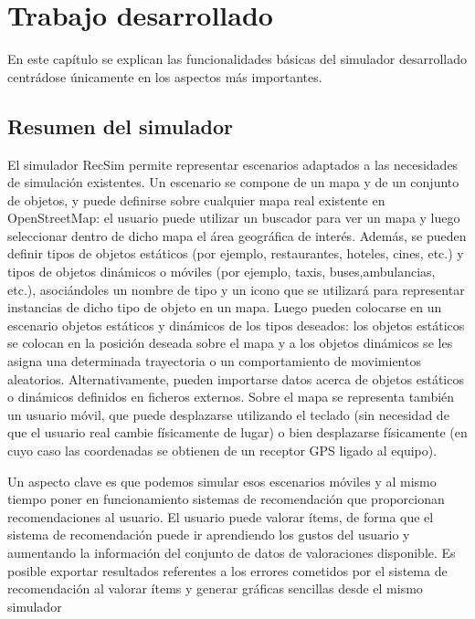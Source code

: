 \chapter{Trabajo desarrollado}

En este capítulo se explican las funcionalidades básicas del simulador desarrollado centrádose únicamente en los aspectos más importantes.

\section{Resumen del simulador}

El simulador RecSim permite representar escenarios adaptados a las necesidades de simulación existentes. Un escenario se compone de un mapa y de un conjunto de objetos, y puede definirse sobre cualquier mapa real existente en OpenStreetMap: el usuario puede utilizar un buscador para ver un mapa y luego seleccionar dentro de dicho mapa el área geográfica de interés. Además, se pueden definir tipos de objetos estáticos (por ejemplo, restaurantes, hoteles, cines, etc.) y tipos de objetos dinámicos o móviles (por ejemplo, taxis, buses,ambulancias, etc.), asociándoles un nombre de tipo y un icono que se utilizará para representar instancias de dicho tipo de objeto en un mapa. Luego pueden colocarse en un escenario objetos estáticos y dinámicos de los tipos deseados: los objetos estáticos se colocan en la posición deseada sobre el mapa y a los objetos dinámicos se les asigna una determinada trayectoria o un comportamiento de movimientos aleatorios. Alternativamente, pueden importarse datos acerca de objetos estáticos o dinámicos definidos en ficheros externos. Sobre el mapa se representa también un usuario móvil, que puede desplazarse utilizando el teclado (sin necesidad de que el usuario real cambie físicamente de lugar) o bien desplazarse físicamente (en cuyo caso las coordenadas se obtienen de un receptor GPS ligado al equipo).

Un aspecto clave es que podemos simular esos escenarios móviles y al mismo tiempo poner en funcionamiento sistemas de recomendación que proporcionan recomendaciones al usuario. El usuario puede valorar ítems, de forma que el sistema de recomendación puede ir aprendiendo los gustos del usuario y aumentando la información del conjunto de datos de valoraciones disponible. Es posible exportar resultados referentes a los errores cometidos por el sistema de recomendación al valorar ítems y generar gráficas sencillas desde el mismo simulador

